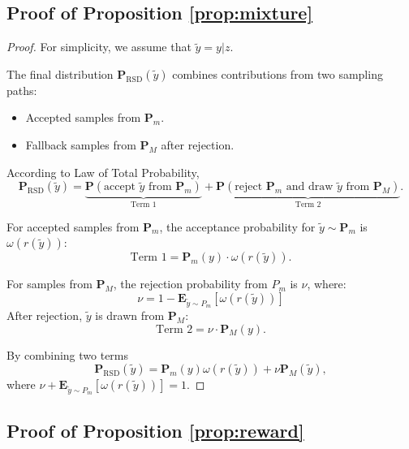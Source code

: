 \documentclass{article}
\theoremstyle{plain}
\theoremstyle{definition}
\theoremstyle{remark}
\begin{document}
\subsection{Proof of Proposition \ref{prop:mixture}}
\begin{proof}

For simplicity, we assume that $\tilde y = y|z$.

The final distribution \( \textbf{P}_{\text{RSD}}(\tilde{y}) \) combines contributions from two sampling paths:
\begin{itemize}
    \item Accepted samples from \( \textbf{P}_m \).
    \item Fallback samples from \( \textbf{P}_M \) after rejection.
\end{itemize}

According to Law of Total Probability,
\[
\textbf{P}_{\text{RSD}}(\tilde{y}) = \underbrace{\textbf{P}(\text{accept } \tilde y \text{ from } \textbf{P}_m)}_{\text{Term 1}} + \underbrace{\textbf{P}(\text{reject } \textbf{P}_m \text{ and draw } \tilde y \text{ from } \textbf{P}_M)}_{\text{Term 2}}.
\]

For accepted samples from \( \textbf{P}_m \), 
the acceptance probability for \(\tilde y \sim \textbf{P}_m \) is \( \omega(r(\tilde y)) \):
\[
\text{Term 1} = \textbf{P}_m(y) \cdot \omega(r(\tilde y)).
\]

For samples from \( \textbf{P}_M \), 
the rejection probability from \( P_m \) is \(  \nu \), where:
\[
\nu = 1-\mathbf{E}_{\tilde y \sim P_m}\left[\omega(r(\tilde y))\right] 
\]
After rejection, \( \tilde y \) is drawn from \( \textbf{P}_M \):
\[
\text{Term 2} = \nu \cdot \textbf{P}_M(y).
\]

By combining two terms
\[
\textbf{P}_{\text{RSD}}(\tilde y) = \textbf{P}_m(y) \omega(r(\tilde y)) + \nu \textbf{P}_M(\tilde y),
\]
where $\nu + \mathbf{E}_{\tilde y \sim P_m}\left[\omega(r(\tilde y))\right]  = 1$.




    
\end{proof}
\subsection{Proof of Proposition \ref{prop:reward}}
\end{document}
